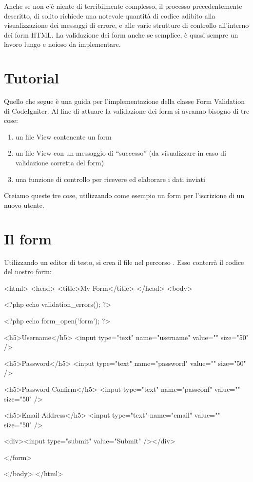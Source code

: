 Anche se non c'è niente di terribilmente complesso, il processo precedentemente descritto, di solito richiede una notevole quantità di codice adibito alla visualizzazione dei messaggi di errore, e alle varie strutture di controllo all'interno dei form \ac{HTML}. La validazione dei form anche se semplice, è quasi sempre un lavoro lungo e noioso da implementare.

\section*{Tutorial}
Quello che segue è una guida per l'implementazione della classe Form Validation di CodeIgniter. Al fine di attuare la validazione dei form si avranno bisogno di tre cose:

\begin{enumerate}
\item un file View contenente un form
\item un file View con un messaggio di ``successo'' (da visualizzare in caso di validazione corretta del form)
\item una funzione di controllo per ricevere ed elaborare i dati inviati
\end{enumerate}

Creiamo queste tre cose, utilizzando come esempio un form per l'iscrizione di un nuovo utente.

\section*{Il form}
Utilizzando un editor di testo, si crea il file  nel percorso . Esso conterrà il codice del nostro form:

\begin{html}
<html>
<head>
<title>My Form</title>
</head>
<body>

<?php echo validation_errors(); ?>

<?php echo form_open('form'); ?>

<h5>Username</h5>
<input type="text" name="username" value="" size="50" />

<h5>Password</h5>
<input type="text" name="password" value="" size="50" />

<h5>Password Confirm</h5>
<input type="text" name="passconf" value="" size="50" />

<h5>Email Address</h5>
<input type="text" name="email" value="" size="50" />

<div><input type="submit" value="Submit" /></div>

</form>

</body>
</html>
\end{html}

